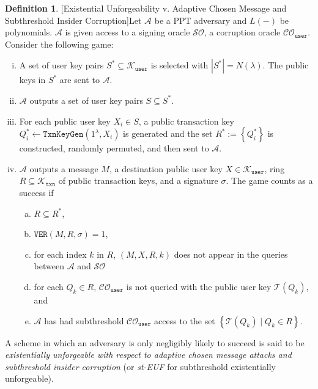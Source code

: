 \documentclass{mrl}
\theoremstyle{definition}
\newtheorem{defn}[theorem]{Definition}
\begin{document}
\begin{defn}{[Existential Unforgeability v. Adaptive Chosen Message and Subthreshold Insider Corruption]}\label{steuf} Let $\mathcal{A}$ be a PPT adversary and $L(-)$ be polynomials. $\mathcal{A}$ is given access to a signing oracle $\mathcal{SO}$, a corruption oracle $\mathcal{CO}_{\texttt{user}}$. Consider the following game:

\begin{enumerate}[(i)]
\item A set of user key pairs $S^* \subseteq  \mathcal{K}_{\texttt{user}}$ is selected with $\left|S^*\right| = N(\lambda)$. The public keys in $S^*$ are sent to $\mathcal{A}$.
\item $\mathcal{A}$ outputs a set of user key pairs $S \subseteq S^*$.
\item For each public user key $X_i \in S$, a public transaction key $Q_i^* \leftarrow \texttt{TxnKeyGen}(1^\lambda, X_i)$ is generated and the set $R^* := \left\{Q_i^*\right\}$ is constructed, randomly permuted, and then sent to $\mathcal{A}$.
\item $\mathcal{A}$ outputs a message $M$, a destination public user key $X \in \mathcal{K}_{\texttt{user}}$, ring $R \subseteq \mathcal{K}_{\texttt{txn}}$ of public transaction keys, and a signature $\sigma$. The game counts as a success if 
\begin{enumerate}[(a)]
\item $R \subseteq R^*$,
\item $\texttt{VER}(M,R,\sigma)=1$,
\item for each index $k$ in $R$, $(M,X,R,k)$ does not appear in the queries between $\mathcal{A}$ and $\mathcal{SO}$
\item for each $Q_k \in R$, $\mathcal{CO}_{\texttt{user}}$ is not queried with the public user key $\mathcal{T}(Q_k)$, and
\item $\mathcal{A}$ has had subthreshold $\mathcal{CO}_{\texttt{user}}$ access to the set $\left\{\mathcal{T}(Q_k) \mid Q_k \in R\right\}$.

\end{enumerate}
\end{enumerate}
A scheme in which an adversary is only negligibly likely to succeed is said to be \textit{existentially unforgeable with respect to adaptive chosen message attacks and subthreshold insider corruption} (or \textit{st-EUF} for subthreshold existentially unforgeable).
\end{defn}
\end{document}
